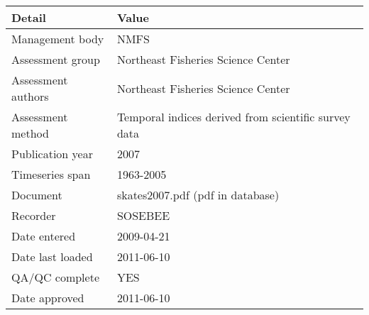 \begin{table}[htb]
\centering
\begin{tabular}{lp{7cm}}
\toprule
Detail & Value \\
\midrule
Management body    & NMFS                                                 \\
Assessment group   & Northeast Fisheries Science Center                   \\
Assessment authors & Northeast Fisheries Science Center                   \\
Assessment method  & Temporal indices derived from scientific survey data \\
Publication year   & 2007                                                 \\
Timeseries span    & 1963-2005                                            \\
Document           & skates2007.pdf (pdf in database)                     \\
Recorder           & SOSEBEE                                              \\
Date entered       & 2009-04-21                                           \\
Date last loaded   & 2011-06-10                                           \\
QA/QC complete     & YES                                                  \\
Date approved      & 2011-06-10                                           \\
\bottomrule
\end{tabular}
\label{tab:assessdet}
\end{table}
